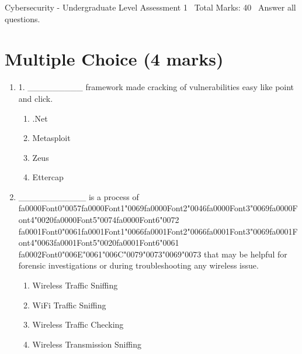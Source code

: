 \documentclass[12pt]{article}
\begin{document}
\begin{center}
Cybersecurity - Undergraduate Level Assessment 1 \
Total Marks: 40 \
Answer all questions.
\end{center}

\section*{Multiple Choice (4 marks)}
\begin{enumerate}[label=\arabic*.]
\item 1. \_\_\_\_\_\_\_\_\_ framework made cracking of vulnerabilities easy like point and click.
\begin{enumerate}[label=(\alph*)]
    \item .Net
    \item Metasploit
    \item Zeus
    \item Ettercap
\end{enumerate}
\item \_\_\_\_\_\_\_\_\_\_\_ is a process of {\csname fa0000Font0\endcsname\char"0057}{\csname fa0000Font1\endcsname\char"0069}{\csname fa0000Font2\endcsname\char"0046}{\csname fa0000Font3\endcsname\char"0069}{\csname fa0000Font4\endcsname\char"0020}{\csname fa0000Font5\endcsname\char"0074}{\csname fa0000Font6\endcsname\char"0072} {\csname fa0001Font0\endcsname\char"0061}{\csname fa0001Font1\endcsname\char"0066}{\csname fa0001Font2\endcsname\char"0066}{\csname fa0001Font3\endcsname\char"0069}{\csname fa0001Font4\endcsname\char"0063}{\csname fa0001Font5\endcsname\char"0020}{\csname fa0001Font6\endcsname\char"0061} {\csname fa0002Font0\endcsname\char"006E}{\char"0061}{\char"006C}{\char"0079}{\char"0073}{\char"0069}{\char"0073} that may be helpful for forensic investigations or during troubleshooting any wireless issue.
\begin{enumerate}[label=(\alph*)]
    \item Wireless Traffic Sniffing
    \item WiFi Traffic Sniffing
    \item Wireless Traffic Checking
    \item Wireless Transmission Sniffing
\end{enumerate}
\end{enumerate}
\end{document}
